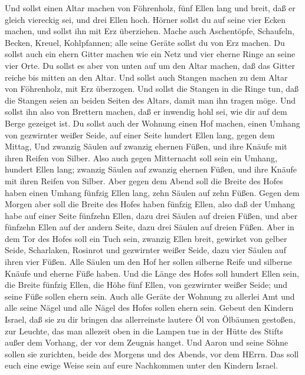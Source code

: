  Und sollst einen Altar machen von Föhrenholz, fünf Ellen
lang und breit, daß er gleich viereckig sei, und drei Ellen hoch.
 Hörner sollst du auf seine vier Ecken machen, und sollst
ihn mit Erz überziehen.  Mache auch Aschentöpfe, Schaufeln,
Becken, Kreuel, Kohlpfannen; alle seine Geräte sollst du von Erz machen.
 Du sollst auch ein ehern Gitter machen wie ein Netz und
vier eherne Ringe an seine vier Orte.  Du sollst es aber von
unten auf um den Altar machen, daß das Gitter reiche bis mitten an den
Altar.  Und sollst auch Stangen machen zu dem Altar von
Föhrenholz, mit Erz überzogen.  Und sollst die Stangen in
die Ringe tun, daß die Stangen seien an beiden Seiten des Altars, damit
man ihn tragen möge.  Und sollst ihn also von Brettern
machen, daß er inwendig hohl sei, wie dir auf dem Berge gezeiget ist.
 Du sollst auch der Wohnung einen Hof machen, einen Umhang
von gezwirnter weißer Seide, auf einer Seite hundert Ellen lang, gegen
dem Mittag,  Und zwanzig Säulen auf zwanzig ehernen Füßen,
und ihre Knäufe mit ihren Reifen von Silber.  Also auch
gegen Mitternacht soll sein ein Umhang, hundert Ellen lang; zwanzig
Säulen auf zwanzig ehernen Füßen, und ihre Knäufe mit ihren Reifen von
Silber.  Aber gegen dem Abend soll die Breite des Hofes
haben einen Umhang fünfzig Ellen lang, zehn Säulen auf zehn Füßen.
 Gegen dem Morgen aber soll die Breite des Hofes haben
fünfzig Ellen,  also daß der Umhang habe auf einer Seite
fünfzehn Ellen, dazu drei Säulen auf dreien Füßen,  und
aber fünfzehn Ellen auf der andern Seite, dazu drei Säulen auf dreien
Füßen.  Aber in dem Tor des Hofes soll ein Tuch sein,
zwanzig Ellen breit, gewirket von gelber Seide, Scharlaken, Rosinrot und
gezwirnter weißer Seide, dazu vier Säulen auf ihren vier Füßen.
 Alle Säulen um den Hof her sollen silberne Reife und
silberne Knäufe und eherne Füße haben.  Und die Länge des
Hofes soll hundert Ellen sein, die Breite fünfzig Ellen, die Höhe fünf
Ellen, von gezwirnter weißer Seide; und seine Füße sollen ehern sein.
 Auch alle Geräte der Wohnung zu allerlei Amt und alle
seine Nägel und alle Nägel des Hofes sollen ehern sein. 
Gebeut den Kindern Israel, daß sie zu dir bringen das allerreinste
lautere Öl von Ölbäumen gestoßen, zur Leuchte, das man allezeit oben in
die Lampen tue  in der Hütte des Stifts außer dem Vorhang,
der vor dem Zeugnis hanget. Und Aaron und seine Söhne sollen sie
zurichten, beide des Morgens und des Abends, vor dem HErrn. Das soll
euch eine ewige Weise sein auf eure Nachkommen unter den Kindern Israel.

